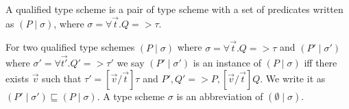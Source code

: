 \begin{defn}
  A qualified type scheme is a pair of type scheme with a set of predicates written as $(P \mid \sigma)$,
  where $\sigma = \forall \vec{t}. Q => \tau$.
\end{defn}
\begin{defn}
  For two qualified type schemes $(P \mid \sigma)$ where $\sigma = \forall \vec{t}. Q => \tau$ and
  $(P' \mid \sigma')$ where $\sigma' = \forall \vec{t'}. Q' => \tau'$ we say $(P' \mid \sigma')$ is an
  instance of $(P \mid \sigma)$ iff there exists $\vec{v}$ such that $\tau' = [\vec{v}/ \vec{t}]\tau$ and
  $P',Q' => P, [\vec{v}/ \vec{t}]Q$. We write it as $(P' \mid \sigma') \sqsubseteq (P \mid \sigma)$. A type scheme
  $\sigma$ is an abbreviation of $(\emptyset \mid \sigma)$.
\end{defn}


